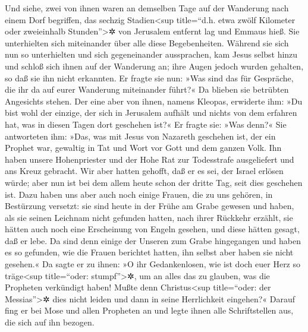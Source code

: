  Und siehe, zwei von ihnen waren an demselben Tage auf
der Wanderung nach einem Dorf begriffen, das sechzig
Stadien\textless sup title=``d.h. etwa zwölf Kilometer oder zweieinhalb
Stunden''\textgreater✲ von Jerusalem entfernt lag und Emmaus hieß.
 Sie unterhielten sich miteinander über alle diese
Begebenheiten.  Während sie sich nun so unterhielten und
sich gegeneinander aussprachen, kam Jesus selbst hinzu und schloß sich
ihnen auf der Wanderung an;  ihre Augen jedoch wurden
gehalten, so daß sie ihn nicht erkannten.  Er fragte sie
nun: »Was sind das für Gespräche, die ihr da auf eurer Wanderung
miteinander führt?« Da blieben sie betrübten Angesichts stehen.
 Der eine aber von ihnen, namens Kleopas, erwiderte ihm:
»Du bist wohl der einzige, der sich in Jerusalem aufhält und nichts von
dem erfahren hat, was in diesen Tagen dort geschehen ist?«
 Er fragte sie: »Was denn?« Sie antworteten ihm: »Das,
was mit Jesus von Nazareth geschehen ist, der ein Prophet war, gewaltig
in Tat und Wort vor Gott und dem ganzen Volk.  Ihn haben
unsere Hohenpriester und der Hohe Rat zur Todesstrafe ausgeliefert und
ans Kreuz gebracht.  Wir aber hatten gehofft, daß er es
sei, der Israel erlösen würde; aber nun ist bei dem allem heute schon
der dritte Tag, seit dies geschehen ist.  Dazu haben uns
aber auch noch einige Frauen, die zu uns gehören, in Bestürzung
versetzt: sie sind heute in der Frühe am Grabe gewesen 
und haben, als sie seinen Leichnam nicht gefunden hatten, nach ihrer
Rückkehr erzählt, sie hätten auch noch eine Erscheinung von Engeln
gesehen, und diese hätten gesagt, daß er lebe.  Da sind
denn einige der Unseren zum Grabe hingegangen und haben es so gefunden,
wie die Frauen berichtet hatten, ihn selbst aber haben sie nicht
gesehen.«  Da sagte er zu ihnen: »O ihr Gedankenlosen,
wie ist doch euer Herz so träge\textless sup title=``oder:
stumpf''\textgreater✲, um an alles das zu glauben, was die Propheten
verkündigt haben!  Mußte denn Christus\textless sup
title=``oder: der Messias''\textgreater✲ dies nicht leiden und dann in
seine Herrlichkeit eingehen?«  Darauf fing er bei Mose
und allen Propheten an und legte ihnen alle Schriftstellen aus, die sich
auf ihn bezogen.


